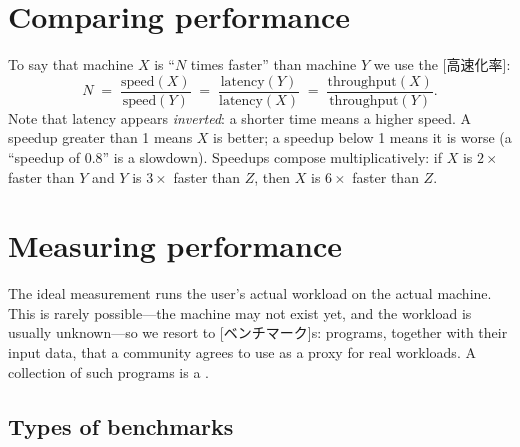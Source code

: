 \documentclass[../main.tex]{subfiles}
\begin{document}
\section{Comparing performance}

To say that machine $X$ is \enquote{$N$ times faster} than machine $Y$ we
use the [高速化率]:
\begin{equation}
  N \;=\; \frac{\text{speed}(X)}{\text{speed}(Y)}
     \;=\; \frac{\text{latency}(Y)}{\text{latency}(X)}
     \;=\; \frac{\text{throughput}(X)}{\text{throughput}(Y)} .
  \label{eq:speedup}
\end{equation}
Note that latency appears \emph{inverted}: a shorter time means a higher
speed.  A speedup greater than 1 means $X$ is
better; a speedup below 1 means it is worse (a \enquote{speedup of 0.8} is
a slowdown).  Speedups compose multiplicatively: if $X$ is $2\times$ faster
than $Y$ and $Y$ is $3\times$ faster than $Z$, then $X$ is $6\times$ faster than $Z$.


\section{Measuring performance}

The ideal measurement runs the user's actual workload on the actual machine.
This is rarely possible---the machine may not exist yet, and the workload is
usually unknown---so we resort to [ベンチマーク]s: programs,
together with their input data, that a community agrees to use as a proxy
for real workloads.  A collection
of such programs is a .

\subsection{Types of benchmarks}
\end{document}
